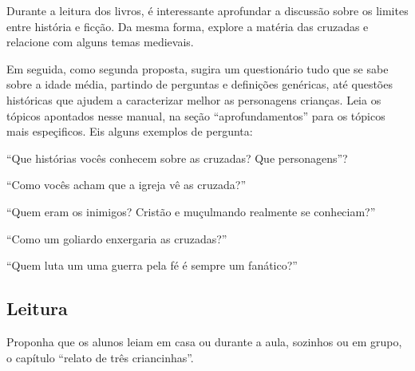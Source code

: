 \documentclass[12pt]{extarticle}
\begin{document}
Durante a leitura dos livros, é interessante aprofundar a discussão sobre os limites entre
história e ficção. Da mesma forma, explore a matéria 
das cruzadas e relacione com alguns temas medievais.

 
Em seguida, como segunda proposta, sugira um questionário tudo que se sabe sobre 
a idade média, partindo de perguntas e definições genéricas, até questões históricas 
que ajudem a caracterizar melhor as personagens crianças. Leia os 
tópicos apontados nesse manual, na seção ``aprofundamentos'' para 
os tópicos mais espeçificos.  Eis alguns exemplos de pergunta:

``Que histórias vocês conhecem sobre as cruzadas? Que personagens''?

``Como vocês acham que a igreja vê as cruzada?''

``Quem eram os inimigos? Cristão e muçulmando realmente se conheciam?''

``Como um goliardo enxergaria as cruzadas?''

``Quem luta um uma guerra pela fé é sempre um fanático?'' 


\subsection{Leitura}

Proponha que os alunos leiam em casa ou durante a aula, sozinhos ou em grupo, 
o capítulo “relato de três criancinhas”.
\end{document}
